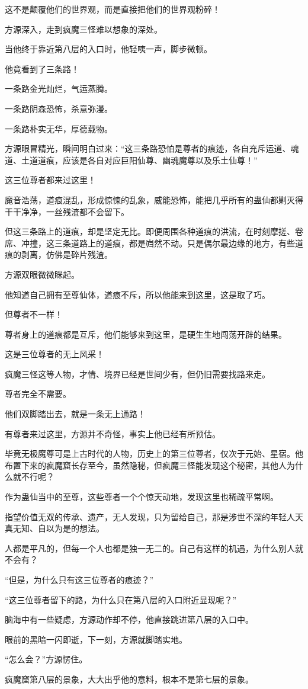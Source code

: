 \begin{this_body}
这不是颠覆他们的世界观，而是直接把他们的世界观粉碎！

方源深入，走到疯魔三怪难以想象的深处。

当他终于靠近第八层的入口时，他轻咦一声，脚步微顿。

他竟看到了三条路！

一条路金光灿烂，气运蒸腾。

一条路阴森恐怖，杀意弥漫。

一条路朴实无华，厚德载物。

方源眼冒精光，瞬间明白过来：“这三条路恐怕是尊者的痕迹，各自充斥运道、魂道、土道道痕，应该是各自对应巨阳仙尊、幽魂魔尊以及乐土仙尊！”

这三位尊者都来过这里！

魔音浩荡，道痕混乱，形成惊悚的乱象，威能恐怖，能把几乎所有的蛊仙都剿灭得干干净净，一丝残渣都不会留下。

但这三条路上的道痕，却是坚定无比。即便周围各种道痕的洪流，在时刻摩搓、卷席、冲撞，这三条道路上的道痕，都是岿然不动。只是偶尔最边缘的地方，有些道痕的剥离，仿佛是碎片残渣。

方源双眼微微眯起。

他知道自己拥有至尊仙体，道痕不斥，所以他能来到这里，这是取了巧。

但尊者不一样！

尊者身上的道痕都是互斥，他们能够来到这里，是硬生生地闯荡开辟的结果。

这是三位尊者的无上风采！

疯魔三怪这等人物，才情、境界已经是世间少有，但仍旧需要找路来走。

尊者完全不需要。

他们双脚踏出去，就是一条无上通路！

有尊者来过这里，方源并不奇怪，事实上他已经有所预估。

毕竟无极魔尊可是上古时代的人物，历史上的第三位尊者，仅次于元始、星宿。他布置下来的疯魔窟长存至今，虽然隐秘，但疯魔三怪能发现这个秘密，其他人为什么就不行呢？

作为蛊仙当中的至尊，这些尊者一个个惊天动地，发现这里也稀疏平常啊。

指望价值无双的传承、遗产，无人发现，只为留给自己，那是涉世不深的年轻人天真无知、自以为是的想法。

人都是平凡的，但每一个人也都是独一无二的。自己有这样的机遇，为什么别人就不会有？

“但是，为什么只有这三位尊者的痕迹？”

“这三位尊者留下的路，为什么只在第八层的入口附近显现呢？”

脑海中有一些疑虑，方源动作却不停，他直接跳进第八层的入口中。

眼前的黑暗一闪即逝，下一刻，方源就脚踏实地。

“怎么会？”方源愣住。

疯魔窟第八层的景象，大大出乎他的意料，根本不是第七层的景象。

\end{this_body}

